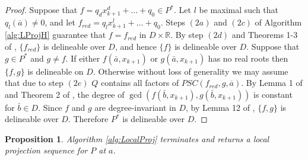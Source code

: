 \documentclass[english]{amsart}
\numberwithin{equation}{section}
\numberwithin{figure}{section}
\newtheorem{prop}[thm]{Proposition}
\begin{document}
\begin{proof}
Suppose that $f=q_{d}x_{k+1}^{d}+\ldots+q_{0}\in P^{*}$. Let $l$
be maximal such that $q_{l}(\overline{a})\neq0$, and let $f_{red}=q_{l}x_{k+1}^{l}+\ldots+q_{0}$.
Steps $(2a)$ and $(2c)$ of Algorithm \ref{alg:LProjH} guarantee
that $f=f_{red}$ in $D\times\mathbb{R}$. By step $(2d)$ and Theorems
1-3 of \cite{C}, $\{f_{red}\}$ is delineable over $D$, and hence
$\{f\}$ is delineable over $D$. Suppose that $g\in P^{*}$ and $g\neq f$.
If either $f(\bar{a},x_{k+1})$ or $g(\bar{a},x_{k+1})$ has no real
roots then $\{f,g\}$ is delineable on $D$. Otherwise without loss
of generality we may assume that due to step $(2e)$ $Q$ contains
all factors of $PSC(f_{red},g,\overline{a})$. By Lemma 1 of \cite{H}
and Theorem 2 of \cite{C}, the degree of $\gcd(f(\bar{b},x_{k+1}),g(\bar{b},x_{k+1}))$
is constant for $\bar{b}\in D$. Since $f$ and $g$ are degree-invariant
in $D$, by Lemma 12 of \cite{S9}, $\{f,g\}$ is delineable over
$D$. Therefore $P^{*}$ is delineable over $D$. \end{proof}
\begin{prop}
\label{pro:LocalProj}Algorithm \ref{alg:LocalProj} terminates and
returns a local projection sequence for $P$ at $a$.\textup{\emph{ }}\end{prop}
\end{document}

